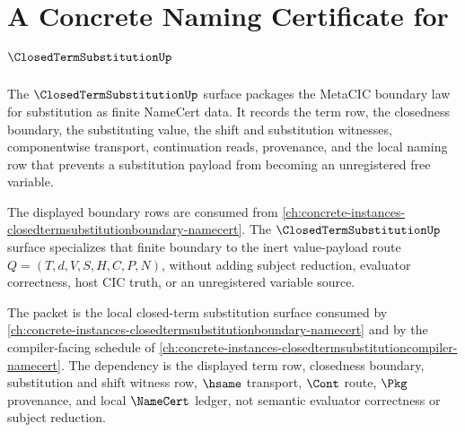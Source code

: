 \chapter{A Concrete Naming Certificate for $\ClosedTermSubstitutionUp$}
\label{ch:concrete-instances-closedtermsubstitution-namecert}

The $\ClosedTermSubstitutionUp$ surface packages the MetaCIC boundary law for substitution as finite NameCert data. It records the term row, the closedness boundary, the substituting value, the shift and substitution witnesses, componentwise transport, continuation reads, provenance, and the local naming row that prevents a substitution payload from becoming an unregistered free variable.

The displayed boundary rows are consumed from \autoref{ch:concrete-instances-closedtermsubstitutionboundary-namecert}. The $\ClosedTermSubstitutionUp$ surface specializes that finite boundary to the inert value-payload route $Q=(T,d,V,S,H,C,P,N)$, without adding subject reduction, evaluator correctness, host CIC truth, or an unregistered variable source.

The packet is the local closed-term substitution surface consumed by \autoref{ch:concrete-instances-closedtermsubstitutionboundary-namecert} and by the compiler-facing schedule of \autoref{ch:concrete-instances-closedtermsubstitutioncompiler-namecert}. The dependency is the displayed term row, closedness boundary, substitution and shift witness row, $\hsame$ transport, $\Cont$ route, $\Pkg$ provenance, and local $\NameCert$ ledger, not semantic evaluator correctness or subject reduction.

